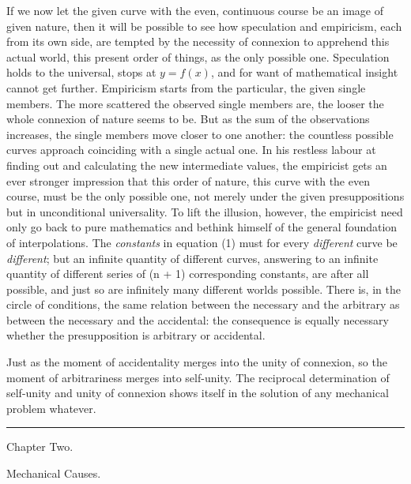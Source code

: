 \documentclass[12pt,a4paper]{book}
\newcommand{\kapitel}[2]{%
  \par\vspace{1.8\baselineskip}%
  {\centering #1\par\vspace{0.25\baselineskip}\large #2\par}%
  \addcontentsline{toc}{chapter}{#1 #2}%
  \vspace{1.1\baselineskip}\par\nointerlineskip}
\newcommand{\streg}{\begin{center}\rule{2cm}{0.4pt}\end{center}}
\begin{document}
{If we now let the given curve with the even, continuous course be an image of given nature,
then it will be possible to see how speculation and empiricism, each from its own side, are
tempted by the necessity of connexion to apprehend this actual world, this present order of
things, as the only possible one. Speculation holds to the universal, stops at $y = f(x)$,
and for want of mathematical insight cannot get further. Empiricism starts from the
particular, the given single members. The more scattered the observed single members are,
the looser the whole connexion of nature seems to be. But as the sum of the observations
increases, the single members move closer to one another: the countless possible curves
approach coinciding with a single actual one. In his restless labour at finding out and
calculating the new intermediate values, the empiricist gets an ever stronger impression
that this order of nature, this curve with the even course, must be the only possible one,
not merely under the given presuppositions but in unconditional universality. To lift the
illusion, however, the empiricist need only go back to pure mathematics and bethink himself
of the general foundation of interpolations. The \emph{constants} in equation (1) must for
every \emph{different} curve be \emph{different}; but an infinite quantity of different
curves, answering to an infinite quantity of different series of (n + 1) corresponding
constants, are after all possible, and just so are infinitely many different worlds
possible.} There is, in the circle of conditions,
the same relation between the necessary and the arbitrary as between the necessary and the
accidental: the
consequence is equally necessary whether the presupposition is arbitrary or accidental.

Just as the moment of accidentality merges into the unity of connexion, so the moment of
arbitrariness merges into self-unity. The reciprocal determination of self-unity and unity
of connexion shows itself in the solution of any mechanical problem whatever.

\streg

\kapitel{Chapter Two.}{Mechanical Causes.}
\end{document}
